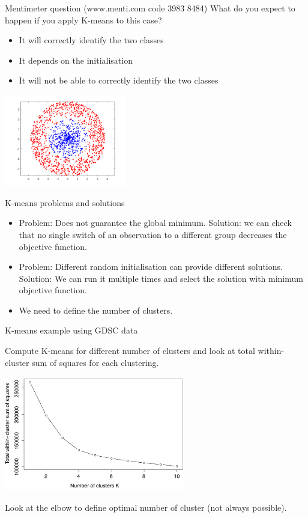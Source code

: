 \documentclass[notes]{beamer}          %
\begin{document}
\begin{frame}{Mentimeter question (www.menti.com code 3983 8484)}
What do you expect to happen if you apply K-means to this case?
\begin{itemize}
\item It will correctly identify the two classes
\item It depends on the initialisation
\item It will not be able to correctly identify the two classes
\end{itemize}
\begin{center}
\includegraphics[height=4cm]{../figures/week_6/nonseparableclass.png}  
\end{center}
\end{frame}

\begin{frame}{K-means problems and solutions}
\begin{itemize}
 \item Problem: Does not guarantee the global minimum. Solution: we can check that no single switch of an observation to a different group decreases the objective function.
 \item Problem: Different random initialisation can provide different solutions. Solution: We can run it multiple times and select the solution with minimum objective function.
 \item We need to define the number of clusters.
\end{itemize}
\end{frame}

\begin{frame}{K-means example using GDSC data}

Compute K-means for different number of clusters and look at total within-cluster sum of squares for each clustering. 
\begin{center}
\includegraphics[height=5cm]{../figures/week_6/Kmeans_differentclustersize.pdf}  
\end{center}
Look at the elbow to define optimal number of cluster (not always possible).
\end{frame}
\end{document}
